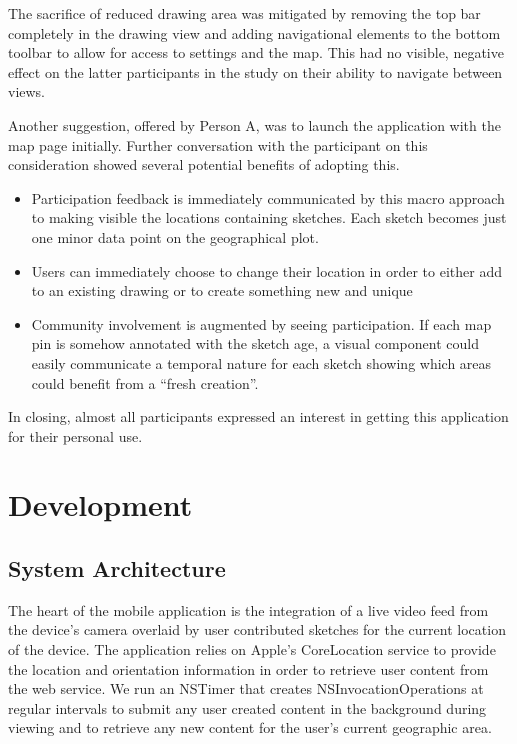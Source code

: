 \documentclass{chi2009}
\begin{document}
The sacrifice of reduced drawing area was mitigated by removing the top bar
completely in the drawing view and adding navigational elements to the bottom
toolbar to allow for access to settings and the map.  This had no visible,
negative effect on the latter participants in the study on their ability to
navigate between views.

Another suggestion, offered by Person A, was to launch the application with the
map page initially.  Further conversation with the participant on this
consideration showed several potential benefits of adopting this.
\begin{itemize}
\item Participation feedback is immediately communicated by this macro approach
to making visible the locations containing sketches.  Each sketch becomes just
one minor data point on the geographical plot.
\item Users can immediately choose to change their location in order to either
add to an existing drawing or to create something new and unique
\item Community involvement is augmented by seeing participation.  If each map
pin is somehow annotated with the sketch age, a visual component could easily
communicate a temporal nature for each sketch showing which areas could benefit
from a ``fresh creation''.
\end{itemize}

In closing, almost all participants expressed an interest in getting this
application for their personal use.



\section{Development}

\subsection{System Architecture}

The heart of the mobile application is the integration of a live video
feed from the device's camera overlaid by user contributed sketches for the
current location of the device.  The application relies on Apple's
CoreLocation service to provide the location and orientation information in
order to retrieve user content from the web service.  We run an NSTimer
that creates NSInvocationOperations at regular intervals to submit any user
created content in the background during viewing and to retrieve any new
content for the user's current geographic area.
\end{document}
